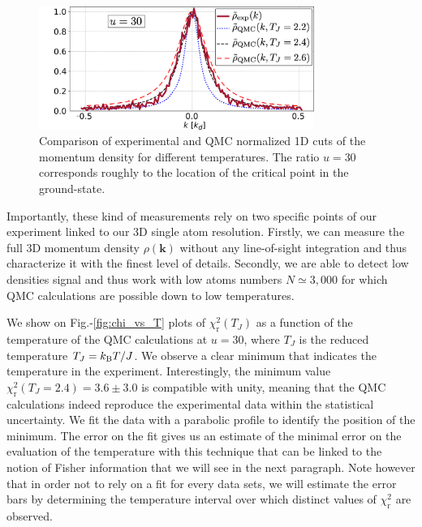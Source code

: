 \begin{figure}
    \centering
    \includegraphics[width=0.8\textwidth]{Fig/Chapter3/comp_qmc.png}
    \caption[Comparison of experimental and QMC normalized 1D cuts of the momentum density for different temperatures]{Comparison of experimental and QMC normalized 1D cuts of the momentum density for different temperatures. The ratio $u=30$ corresponds roughly to the location of the critical point in the ground-state.}
    \label{fig:comp_qmc}
\end{figure}

Importantly, these kind of measurements rely on two specific points of our experiment linked to our 3D single atom resolution. Firstly, we can measure the full 3D momentum density $\rho(\bm{k})$ without any line-of-sight integration and thus characterize it with the finest level of details. Secondly, we are able to detect low densities signal and thus work with low atoms numbers $N \simeq 3,000$ for which QMC calculations are possible down to low temperatures.

We show on Fig.-\ref{fig:chi_vs_T} plots of $\chi_{\mathrm{r}}^{2}(T_J)$ as a function of the temperature of the QMC calculations at $u=30$, where $T_J$ is the reduced temperature $T_J = k_{\mathrm{B}} T /J$. We observe a clear minimum that indicates the temperature in the experiment. Interestingly, the minimum value $\chi_{\mathrm{r}}^{2}\left(T_{J}=2.4\right)=3.6 \pm 3.0$ is compatible with unity, meaning that the QMC calculations indeed reproduce the experimental data within the statistical uncertainty. We fit the data with a parabolic profile to identify the position of the minimum. The error on the fit gives us an estimate of the minimal error on the evaluation of the temperature with this technique that can be linked to the notion of Fisher information that we will see in the next paragraph. Note however that in order not to rely on a fit for every data sets, we will estimate the error bars by determining the temperature interval over which distinct values of $\chi_{\mathrm{r}}^{2}$ are observed.

